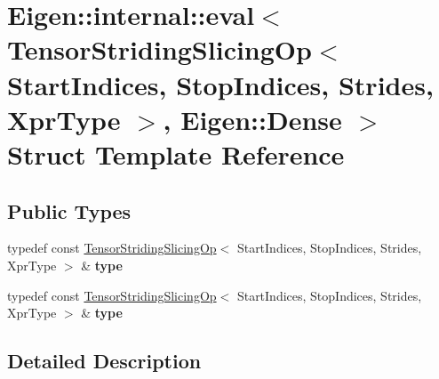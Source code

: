 \hypertarget{struct_eigen_1_1internal_1_1eval_3_01_tensor_striding_slicing_op_3_01_start_indices_00_01_stop_i633f894d67a61646d554d84693f3012b}{}\section{Eigen\+:\+:internal\+:\+:eval$<$ Tensor\+Striding\+Slicing\+Op$<$ Start\+Indices, Stop\+Indices, Strides, Xpr\+Type $>$, Eigen\+:\+:Dense $>$ Struct Template Reference}
\label{struct_eigen_1_1internal_1_1eval_3_01_tensor_striding_slicing_op_3_01_start_indices_00_01_stop_i633f894d67a61646d554d84693f3012b}
\subsection*{Public Types}
\begin{DoxyCompactItemize}
\item 
\mbox{\label{struct_eigen_1_1internal_1_1eval_3_01_tensor_striding_slicing_op_3_01_start_indices_00_01_stop_i633f894d67a61646d554d84693f3012b_a7112e38148a45ef6589a5a9b9129dee7}} 
typedef const \hyperlink{class_eigen_1_1_tensor_striding_slicing_op}{Tensor\+Striding\+Slicing\+Op}$<$ Start\+Indices, Stop\+Indices, Strides, Xpr\+Type $>$ \& {\bfseries type}
\item 
\mbox{\label{struct_eigen_1_1internal_1_1eval_3_01_tensor_striding_slicing_op_3_01_start_indices_00_01_stop_i633f894d67a61646d554d84693f3012b_a7112e38148a45ef6589a5a9b9129dee7}} 
typedef const \hyperlink{class_eigen_1_1_tensor_striding_slicing_op}{Tensor\+Striding\+Slicing\+Op}$<$ Start\+Indices, Stop\+Indices, Strides, Xpr\+Type $>$ \& {\bfseries type}
\end{DoxyCompactItemize}


\subsection{Detailed Description}
